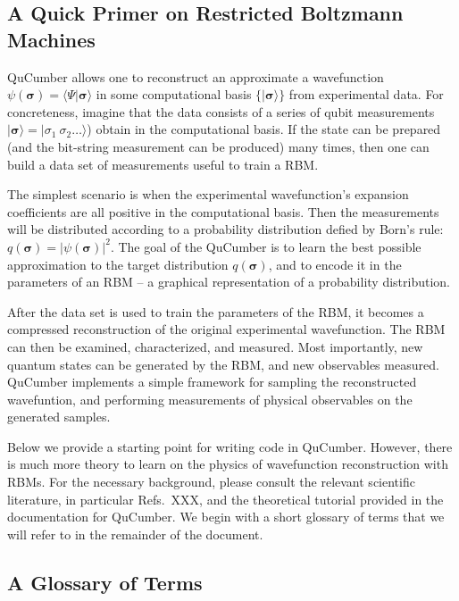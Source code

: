 \documentclass[submission, Phys]{SciPost}
\begin{document}
\subsection{A Quick Primer on Restricted Boltzmann Machines}

QuCumber allows one to reconstruct an approximate a wavefunction $\psi( \boldsymbol{\sigma} )  = \langle \Psi \vert \boldsymbol{\sigma} \rangle$ in some computational basis $\{ \vert \boldsymbol{ \sigma} \rangle \}$ from experimental data.   For concreteness, imagine that the data consists of a series of qubit measurements $\vert {\boldsymbol{ \sigma}} \rangle = \vert { \sigma}_1~{ \sigma}_2 \dots \rangle$) obtain in the computational basis.  If the state can be prepared (and the bit-string measurement can be produced) many times, then one can build a data set of measurements useful to train a RBM.

The simplest scenario is when the experimental wavefunction's expansion coefficients are all positive in the computational basis.  
Then the measurements will be distributed according to a probability distribution defied by Born's rule: $q(\boldsymbol{\sigma}) = | \psi( \boldsymbol{\sigma} ) |^2$.
The goal of the QuCumber is to learn the best possible approximation to the target distribution $q(\boldsymbol{\sigma})$, and to encode it in the parameters of an RBM -- a graphical representation of a probability distribution.

After the data set is used to train the parameters of the RBM, it becomes a compressed reconstruction of the original experimental wavefunction.  The RBM can then be examined, characterized, and measured.  Most importantly, new quantum states can be generated by the RBM, and new observables measured.  QuCumber implements a simple framework for sampling the reconstructed wavefuntion, and performing measurements of physical observables on the generated samples.

Below we provide a starting point for writing code in QuCumber.  However, there is much more theory to learn on the physics of wavefunction reconstruction with RBMs. For the necessary background, please consult the relevant scientific literature, in particular Refs.~XXX, and the theoretical tutorial provided in the documentation for QuCumber.  We begin with a short glossary of terms that we will refer to in the remainder of the document.

\subsection{A Glossary of Terms}
\end{document}

